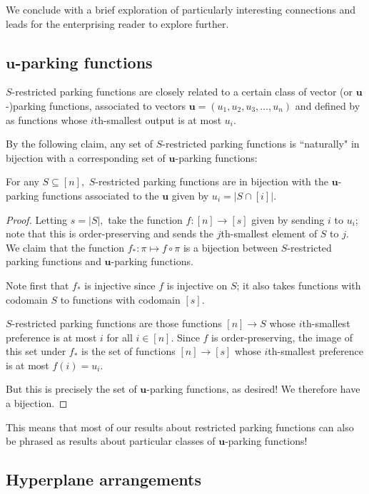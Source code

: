 \documentclass[12pt]{article}
\begin{document}
We conclude with a brief exploration of particularly interesting connections and leads for the enterprising reader to explore further.

\subsection{\texorpdfstring{$\mathbf{u}$}{Vector}-parking functions}

$S$-restricted parking functions are closely related to a certain class of vector (or $\mathbf{u}$-)parking functions, associated to vectors $\mathbf{u}=(u_1,u_2,u_3,\ldots,u_n)$ and defined by \cite{yan-survey-2015} as functions whose $i$th-smallest output is at most $u_i$. 

By the following claim, any set of $S$-restricted parking functions is ``naturally" in bijection with a corresponding set of $\mathbf{u}$-parking functions:

\begin{theorem}
    For any $S\subseteq[n],$ $S$-restricted parking functions are in bijection with the $\mathbf{u}$-parking functions associated to the $\mathbf{u}$ given by $u_i=|S\cap [i]|.$
\end{theorem}
\begin{proof}
    Letting $s=|S|,$ take the function $f:[n]\to [s]$ given by sending $i$ to $u_i$; note that this is order-preserving and sends the $j$th-smallest element of $S$ to $j$. We claim that the function $f_*: \pi\mapsto f\circ \pi$ is a bijection between $S$-restricted parking functions and $\mathbf{u}$-parking functions.

    Note first that $f_*$ is injective since $f$ is injective on $S$; it also takes functions with codomain $S$ to functions with codomain $[s].$
    
    $S$-restricted parking functions are those functions $[n]\to S$ whose $i$th-smallest preference is at most $i$ for all $i\in [n]$. Since $f$ is order-preserving, the image of this set under $f_*$ is the set of functions $[n]\to [s]$ whose $i$th-smallest preference is at most $f(i)=u_i.$

    But this is precisely the set of $\mathbf{u}$-parking functions, as desired! We therefore have a bijection.
\end{proof}

This means that most of our results about restricted parking functions can also be phrased as results about particular classes of $\mathbf{u}$-parking functions!

\subsection{Hyperplane arrangements}
\end{document}
